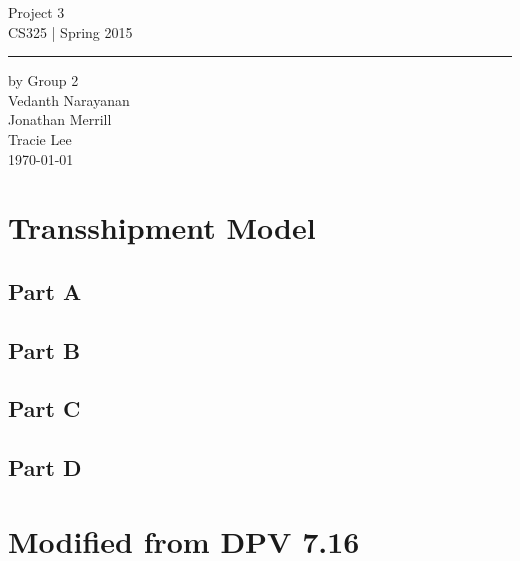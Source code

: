 \documentclass[11pt,letterpaper]{article}
\begin{document}
\begin{titlepage}
    \vspace*{4cm}
    \begin{flushright}
    {\huge
        Project 3\\[5mm]
    }
    {\large
        CS325 | Spring 2015
     }
    \end{flushright}
\hrule
    \begin{flushright}
	by Group 2\\
	Vedanth Narayanan\\
	Jonathan Merrill\\
	Tracie Lee\\
    \vfill
	\today\\
    \end{flushright}
\end{titlepage}

\raggedright

\section{Transshipment Model}
\subsection*{Part A}


\subsection*{Part B}


\subsection*{Part C}
	

\subsection*{Part D}


\section{Modified from DPV 7.16}
\end{document}
